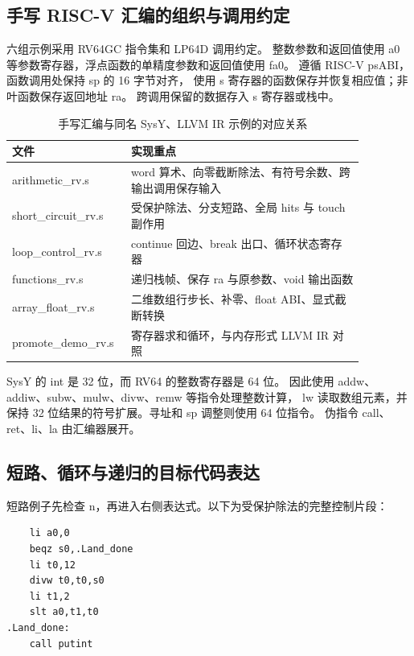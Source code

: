 \subsection{手写 RISC-V 汇编的组织与调用约定}
六组示例采用 RV64GC 指令集和 LP64D 调用约定。
整数参数和返回值使用 a0 等参数寄存器，浮点函数的单精度参数和返回值使用 fa0。
遵循 RISC-V psABI，函数调用处保持 sp 的 16 字节对齐，
使用 s 寄存器的函数保存并恢复相应值；非叶函数保存返回地址 ra。
跨调用保留的数据存入 s 寄存器或栈中。

\begin{table}[htbp]
\centering\small
\caption{手写汇编与同名 SysY、LLVM IR 示例的对应关系}
\begin{tabular}{p{0.25\linewidth}p{0.62\linewidth}}
\toprule
文件 & 实现重点\\
\midrule
arithmetic\_rv.s & word 算术、向零截断除法、有符号余数、跨输出调用保存输入\\
short\_circuit\_rv.s & 受保护除法、分支短路、全局 hits 与 touch 副作用\\
loop\_control\_rv.s & continue 回边、break 出口、循环状态寄存器\\
functions\_rv.s & 递归栈帧、保存 ra 与原参数、void 输出函数\\
array\_float\_rv.s & 二维数组行步长、补零、float ABI、显式截断转换\\
promote\_demo\_rv.s & 寄存器求和循环，与内存形式 LLVM IR 对照\\
\bottomrule
\end{tabular}
\end{table}

SysY 的 int 是 32 位，而 RV64 的整数寄存器是 64 位。
因此使用 addw、addiw、subw、mulw、divw、remw 等指令处理整数计算，
lw 读取数组元素，并保持 32 位结果的符号扩展。寻址和 sp 调整则使用 64 位指令。
伪指令 call、ret、li、la 由汇编器展开。

\subsection{短路、循环与递归的目标代码表达}
短路例子先检查 n，再进入右侧表达式。以下为受保护除法的完整控制片段：

\par\vspace{0.7\baselineskip}\noindent\begin{minipage}[t]{\linewidth}
\begin{lstlisting}
    li a0,0
    beqz s0,.Land_done
    li t0,12
    divw t0,t0,s0
    li t1,2
    slt a0,t1,t0
.Land_done:
    call putint
\end{lstlisting}
\end{minipage}\par\vspace{0.5\baselineskip}

